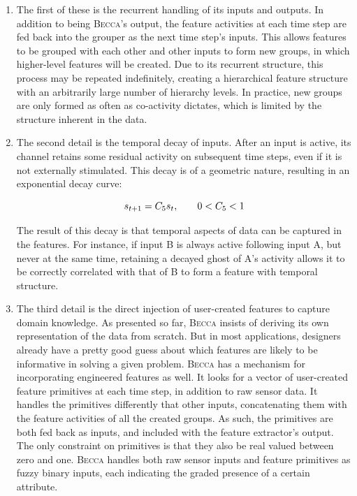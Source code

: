 \begin{enumerate}

\item The first of these is the recurrent handling of its inputs and outputs. In addition to being \textsc{Becca}'s output, the feature activities at each time step are fed back into the grouper as the next time step's inputs. This allows features to be grouped with each other and other inputs to form new groups, in which higher-level features will be created. Due to its recurrent structure, this process may be repeated indefinitely, creating a hierarchical feature structure with an arbitrarily large number of hierarchy levels. In practice, new groups are only formed as often as co-activity dictates, which is limited by the structure inherent in the data.

\item The second detail is the temporal decay of inputs. After an input is active, its channel retains some residual activity on subsequent time steps, even if it is not externally stimulated. This decay is of a geometric nature, resulting in an exponential decay curve: 

\begin{equation}
s_{t+1} = C_5 s_t \mbox{,   \hspace{0.2in}  } 0 < C_5 < 1
\end{equation}

The result of this decay is that temporal aspects of data can be captured in the features. For instance, if input B is always active following input A, but never at the same time, retaining a decayed ghost of A's activity allows it to be correctly correlated with that of B to form a feature with temporal structure.

\item The third detail is the direct injection of user-created features to capture domain knowledge. As presented so far, \textsc{Becca} insists of deriving its own representation of the data from scratch. But in most applications, designers already have a pretty good guess about which features are likely to be informative in solving a given problem. \textsc{Becca} has a mechanism for incorporating engineered features as well. It looks for a vector of user-created feature primitives at each time step, in addition to raw sensor data. It handles the primitives differently that other inputs, concatenating them with the feature activities of all the created groups. As such, the primitives are both fed back as inputs, and included with the feature extractor's output. The only constraint on primitives is that they also be real valued between zero and one. \textsc{Becca} handles both raw sensor inputs and feature primitives as fuzzy binary inputs, each indicating the graded presence of a certain attribute.

\end{enumerate}


